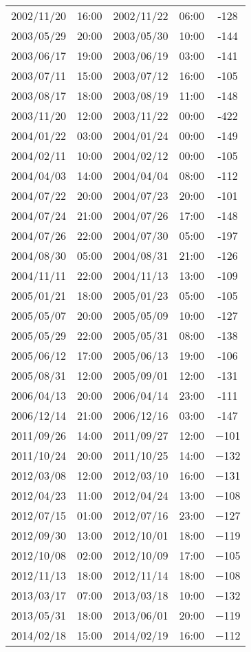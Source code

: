 \begin{table}[h]
\begin{tabular}{ccccc}
	2002/11/20 & 16:00 & 2002/11/22 & 06:00 & -128 \\
	2003/05/29 & 20:00 & 2003/05/30 & 10:00 & -144 \\
	2003/06/17 & 19:00 & 2003/06/19 & 03:00 & -141 \\
	2003/07/11 & 15:00 & 2003/07/12 & 16:00 & -105 \\
	2003/08/17 & 18:00 & 2003/08/19 & 11:00 & -148 \\
	2003/11/20 & 12:00 & 2003/11/22 & 00:00 & -422 \\
	2004/01/22 & 03:00 & 2004/01/24 & 00:00 & -149 \\
	2004/02/11 & 10:00 & 2004/02/12 & 00:00 & -105 \\
	2004/04/03 & 14:00 & 2004/04/04 & 08:00 & -112 \\
	2004/07/22 & 20:00 & 2004/07/23 & 20:00 & -101 \\
	2004/07/24 & 21:00 & 2004/07/26 & 17:00 & -148 \\
	2004/07/26 & 22:00 & 2004/07/30 & 05:00 & -197 \\
	2004/08/30 & 05:00 & 2004/08/31 & 21:00 & -126 \\
	2004/11/11 & 22:00 & 2004/11/13 & 13:00 & -109 \\
	2005/01/21 & 18:00 & 2005/01/23 & 05:00 & -105 \\
	2005/05/07 & 20:00 & 2005/05/09 & 10:00 & -127 \\
	2005/05/29 & 22:00 & 2005/05/31 & 08:00 & -138 \\
	2005/06/12 & 17:00 & 2005/06/13 & 19:00 & -106 \\
	2005/08/31 & 12:00 & 2005/09/01 & 12:00 & -131 \\
	2006/04/13 & 20:00 & 2006/04/14 & 23:00 & -111 \\
	2006/12/14 & 21:00 & 2006/12/16 & 03:00 & -147 \\ 
	2011/09/26 & 14:00 & 2011/09/27 & 12:00 & −101 \\
	2011/10/24 & 20:00 & 2011/10/25 & 14:00 & −132 \\
	2012/03/08 & 12:00 & 2012/03/10 & 16:00 & −131 \\
	2012/04/23 & 11:00 & 2012/04/24 & 13:00 & −108 \\
	2012/07/15 & 01:00 & 2012/07/16 & 23:00 & −127 \\
	2012/09/30 & 13:00 & 2012/10/01 & 18:00 & −119 \\
	2012/10/08 & 02:00 & 2012/10/09 & 17:00 & −105 \\
	2012/11/13 & 18:00 & 2012/11/14 & 18:00 & −108 \\
	2013/03/17 & 07:00 & 2013/03/18 & 10:00 & −132 \\
	2013/05/31 & 18:00 & 2013/06/01 & 20:00 & −119 \\
	2014/02/18 & 15:00 & 2014/02/19 & 16:00 & −112 \\ \hline
	\end{tabular}%
	\end{table}

